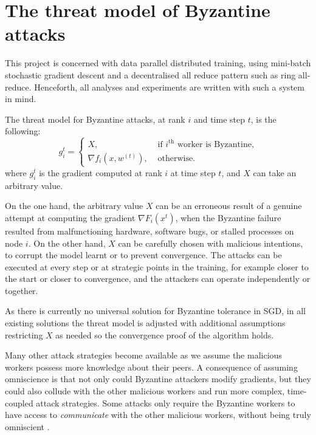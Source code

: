 \documentclass{article}
\begin{document}
\section{The threat model of Byzantine attacks}

This project is concerned with data parallel distributed training, using mini-batch stochastic gradient descent and a decentralised all reduce pattern such as ring all-reduce. Henceforth, all analyses and experiments are written with such a system in mind.

The threat model for Byzantine attacks, at rank $i$ and time step $t$, is the following:
\begin{equation}
g_{i}^{t}= \begin{cases}X, & \text { if } i^\text{th} \text { worker is Byzantine,} \\ \nabla f_i \left(x, w^{(t)}\right), & \text { otherwise. }\end{cases}
\end{equation}
where $g_{i}^{t}$ is the gradient computed at rank $i$ at time step $t$, and $X$ can take an arbitrary value.

On the one hand, the arbitrary value $X$ can be an erroneous result of a genuine attempt at computing the gradient $\nabla F_{i}\left(x^t\right)$, when the Byzantine failure resulted from malfunctioning hardware, software bugs, or stalled processes on node $i$. 
On the other hand, $X$ can be carefully chosen with malicious intentions, to corrupt the model learnt or to prevent convergence. The attacks can be executed at every step or at strategic points in the training, for example closer to the start or closer to convergence, and the attackers can operate independently or together.

As there is currently no universal solution for Byzantine tolerance in SGD, in all existing solutions the threat model is adjusted with additional assumptions restricting $X$ as needed so the convergence proof of the algorithm holds.  

Many other attack strategies become available as we assume the malicious workers possess more knowledge about their peers. A consequence of assuming omniscience is that not only could Byzantine attackers modify gradients, but they could also collude with the other malicious workers and run more complex, time-coupled attack strategies. Some attacks only require the Byzantine workers to have access to \textit{communicate} with the other malicious workers, without being truly omniscient \citep{baruch2019little, xie2020fall}. 
\end{document}

